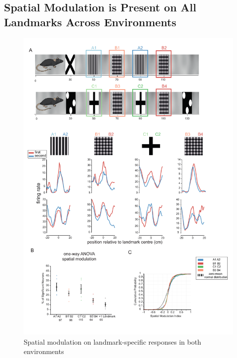 \subsection{Spatial Modulation is Present on All Landmarks Across Environments}

\begin{figure}
    \centering
    \includegraphics[width=1\linewidth]{figures//Chapter 4 V1/fig3_spatial_modulation_intro.pdf}
    \caption{Spatial modulation on landmark-specific responses in both environments}
    \label{fig:placeholder}
\end{figure}

